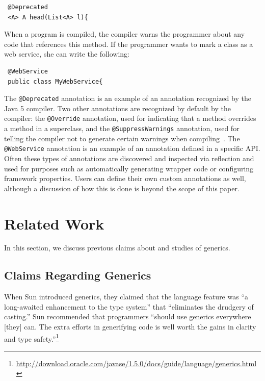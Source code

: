 \documentclass{svjour3}
\newcommand{\code}[1]{\texttt{#1}}
\begin{document}
\begin{lstlisting}
 @Deprecated
 <A> A head(List<A> l){
\end{lstlisting}

\noindent
When a program is compiled, the compiler warns the programmer about any code that 
references this method.
If the programmer wants to mark a class as a web service, she can write the following:

\begin{lstlisting}
 @WebService
 public class MyWebService{
\end{lstlisting}

The \code{@Deprecated} annotation is an example of an annotation recognized by the Java
5 compiler. Two other annotations are recognized by default by the compiler: the \code{@Override} annotation,
used for indicating that a method overrides a method in a superclass,
and the \code{@SuppressWarnings} annotation, used for telling the compiler not to 
generate certain warnings when compiling~\cite{annotation_tutorial}.
The \code{@WebService} annotation is an example of an annotation defined in a specific
API.  Often these types of annotations are discovered and inspected via reflection and
used for purposes such as automatically generating wrapper code or configuring framework properties.
Users can define their own custom annotations as well, although a discussion
of how this is done is beyond the scope of this paper.

\section{Related Work}\label{sec:relatedWork}
 

\noindent
In this section, we discuss previous claims about and studies of generics.

\subsection{Claims Regarding Generics}

When Sun introduced generics, they claimed that the language feature was ``a
long-awaited enhancement to the type system'' that ``eliminates the drudgery of
casting.''
Sun recommended that programmers ``should use generics everywhere [they] can.
The extra efforts in generifying code is well worth the gains in clarity and type
safety.''\footnote{\scriptsize{\url{http://download.oracle.com/javase/1.5.0/docs/guide/language/generics.html}}}
\end{document}
